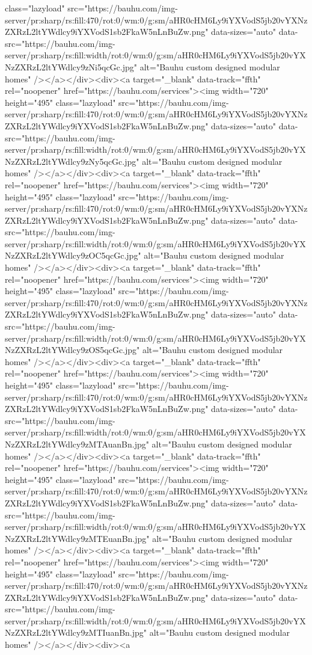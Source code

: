 {{{{{{{class="lazyload" src="https://bauhu.com/img-server/pr:sharp/rs:fill:470/rot:0/wm:0/g:sm/aHR0cHM6Ly9iYXVodS5jb20vYXNzZXRzL2ltYWdlcy9iYXVodS1sb2FkaW5nLnBuZw.png" data-sizes="auto" data-src="https://bauhu.com/img-server/pr:sharp/rs:fill:{width}/rot:0/wm:0/g:sm/aHR0cHM6Ly9iYXVodS5jb20vYXNzZXRzL2ltYWdlcy9zNi5qcGc.jpg" alt="Bauhu custom designed modular homes" /></a></div><div><a target="_blank" data-track="ffth" rel="noopener" href="https://bauhu.com/services"><img width="720" height="495" class="lazyload" src="https://bauhu.com/img-server/pr:sharp/rs:fill:470/rot:0/wm:0/g:sm/aHR0cHM6Ly9iYXVodS5jb20vYXNzZXRzL2ltYWdlcy9iYXVodS1sb2FkaW5nLnBuZw.png" data-sizes="auto" data-src="https://bauhu.com/img-server/pr:sharp/rs:fill:{width}/rot:0/wm:0/g:sm/aHR0cHM6Ly9iYXVodS5jb20vYXNzZXRzL2ltYWdlcy9zNy5qcGc.jpg" alt="Bauhu custom designed modular homes" /></a></div><div><a target="_blank" data-track="ffth" rel="noopener" href="https://bauhu.com/services"><img width="720" height="495" class="lazyload" src="https://bauhu.com/img-server/pr:sharp/rs:fill:470/rot:0/wm:0/g:sm/aHR0cHM6Ly9iYXVodS5jb20vYXNzZXRzL2ltYWdlcy9iYXVodS1sb2FkaW5nLnBuZw.png" data-sizes="auto" data-src="https://bauhu.com/img-server/pr:sharp/rs:fill:{width}/rot:0/wm:0/g:sm/aHR0cHM6Ly9iYXVodS5jb20vYXNzZXRzL2ltYWdlcy9zOC5qcGc.jpg" alt="Bauhu custom designed modular homes" /></a></div><div><a target="_blank" data-track="ffth" rel="noopener" href="https://bauhu.com/services"><img width="720" height="495" class="lazyload" src="https://bauhu.com/img-server/pr:sharp/rs:fill:470/rot:0/wm:0/g:sm/aHR0cHM6Ly9iYXVodS5jb20vYXNzZXRzL2ltYWdlcy9iYXVodS1sb2FkaW5nLnBuZw.png" data-sizes="auto" data-src="https://bauhu.com/img-server/pr:sharp/rs:fill:{width}/rot:0/wm:0/g:sm/aHR0cHM6Ly9iYXVodS5jb20vYXNzZXRzL2ltYWdlcy9zOS5qcGc.jpg" alt="Bauhu custom designed modular homes" /></a></div><div><a target="_blank" data-track="ffth" rel="noopener" href="https://bauhu.com/services"><img width="720" height="495" class="lazyload" src="https://bauhu.com/img-server/pr:sharp/rs:fill:470/rot:0/wm:0/g:sm/aHR0cHM6Ly9iYXVodS5jb20vYXNzZXRzL2ltYWdlcy9iYXVodS1sb2FkaW5nLnBuZw.png" data-sizes="auto" data-src="https://bauhu.com/img-server/pr:sharp/rs:fill:{width}/rot:0/wm:0/g:sm/aHR0cHM6Ly9iYXVodS5jb20vYXNzZXRzL2ltYWdlcy9zMTAuanBn.jpg" alt="Bauhu custom designed modular homes" /></a></div><div><a target="_blank" data-track="ffth" rel="noopener" href="https://bauhu.com/services"><img width="720" height="495" class="lazyload" src="https://bauhu.com/img-server/pr:sharp/rs:fill:470/rot:0/wm:0/g:sm/aHR0cHM6Ly9iYXVodS5jb20vYXNzZXRzL2ltYWdlcy9iYXVodS1sb2FkaW5nLnBuZw.png" data-sizes="auto" data-src="https://bauhu.com/img-server/pr:sharp/rs:fill:{width}/rot:0/wm:0/g:sm/aHR0cHM6Ly9iYXVodS5jb20vYXNzZXRzL2ltYWdlcy9zMTEuanBn.jpg" alt="Bauhu custom designed modular homes" /></a></div><div><a target="_blank" data-track="ffth" rel="noopener" href="https://bauhu.com/services"><img width="720" height="495" class="lazyload" src="https://bauhu.com/img-server/pr:sharp/rs:fill:470/rot:0/wm:0/g:sm/aHR0cHM6Ly9iYXVodS5jb20vYXNzZXRzL2ltYWdlcy9iYXVodS1sb2FkaW5nLnBuZw.png" data-sizes="auto" data-src="https://bauhu.com/img-server/pr:sharp/rs:fill:{width}/rot:0/wm:0/g:sm/aHR0cHM6Ly9iYXVodS5jb20vYXNzZXRzL2ltYWdlcy9zMTIuanBn.jpg" alt="Bauhu custom designed modular homes" /></a></div><div><a }}}}}}}
